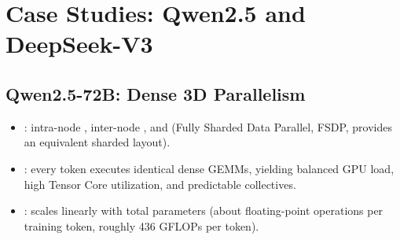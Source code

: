 \section{Case Studies: Qwen2.5 and DeepSeek-V3}

\subsection{Qwen2.5-72B: Dense 3D Parallelism}
\begin{itemize}
    \item {}: intra-node , inter-node , and  (Fully Sharded Data Parallel, FSDP, provides an equivalent sharded layout).
    \item {}: every token executes identical dense GEMMs, yielding balanced GPU load, high Tensor Core utilization, and predictable collectives.
    \item {}: scales linearly with total parameters (about  floating-point operations per training token, roughly 436 GFLOPs per token).
\end{itemize}

